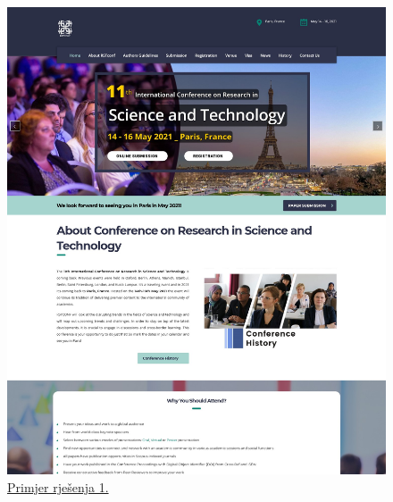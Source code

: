 		\begin{figure}[H]
			\begin{minipage}[t]{0.4\textwidth}
				\includegraphics[width=\linewidth]{slike/frontpage_example1}
				\caption{\href{https://rstconf.org/}{Primjer rješenja 1.}} \label{fig:frontpage_example1}
			\end{minipage}
			\hspace*{\fill}
			\begin{minipage}[t]{0.4\textwidth}

\end{minipage}
\end{figure}
